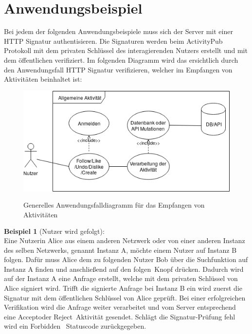 \section{Anwendungsbeispiel}
Bei jedem der folgenden Anwendungsbeispiele muss sich der Server mit einer HTTP Signatur authentisieren. Die Signaturen werden beim ActivityPub Protokoll mit dem privaten Schlüssel des interagierenden Nutzers erstellt und mit dem öffentlichen verifiziert. Im folgenden Diagramm wird das ersichtlich durch den Anwendungsfall \glqq HTTP Signatur verifizieren\grqq, welcher im Empfangen von Aktivitäten beinhaltet ist:\\
\begin{figure}[h]
	\begin{minipage}{\textwidth}
		\centering
		\includegraphics[scale=0.75]{figures/generel-activity-usecase.png}
		\label{fig:generel-activity-usecase}
		\caption{Generelles Anwendungsfalldiagramm für das Empfangen von Aktivitäten}
	\end{minipage}
\end{figure}

\textbf{Beispiel 1} (Nutzer wird gefolgt):\\
Eine Nutzerin Alice aus einem anderen Netzwerk oder von einer anderen Instanz des selben Netzwerks, genannt Instanz A, möchte einem Nutzer auf Instanz B folgen. Dafür muss Alice dem zu folgenden Nutzer Bob über die Suchfunktion auf Instanz A finden und anschließend auf den \glqq folgen\grqq~Knopf drücken. Dadurch wird auf der Instanz A eine Anfrage erstellt, welche mit dem privaten Schlüssel von Alice signiert wird. Trifft die signierte Anfrage bei Instanz B ein wird zuerst die Signatur mit dem öffentlichen Schlüssel von Alice geprüft. Bei einer erfolgreichen Verifikation wird die Anfrage weiter verarbeitet und vom Server entsprechend eine \glqq Accept\grqq oder \glqq Reject\grqq~Aktivität gesendet. Schlägt die Signatur-Prüfung fehl wird ein \glqq Forbidden\grqq~ Statuscode zurückgegeben.\\

